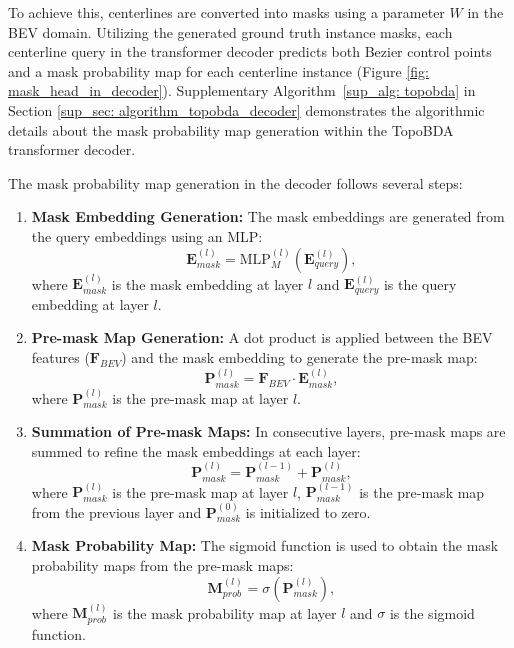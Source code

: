 To achieve this, centerlines are converted into masks using a parameter $W$ in the BEV domain. Utilizing the generated ground truth instance masks, each centerline query in the transformer decoder predicts both Bezier control points and a mask probability map for each centerline instance (Figure \ref{fig: mask_head_in_decoder}). Supplementary Algorithm~\ref{sup_alg: topobda} in Section \ref{sup_sec: algorithm_topobda_decoder} demonstrates the algorithmic details about the mask probability map generation within the TopoBDA transformer decoder. 

The mask probability map generation in the decoder follows several steps:

\begin{enumerate}
    \item \textbf{Mask Embedding Generation:}
    The mask embeddings are generated from the query embeddings using an MLP:
    \begin{equation}
        \mathbf{E}_{mask}^{(l)} = \text{MLP}_{M}^{(l)}(\mathbf{E}_{query}^{(l)}),
    \end{equation}
    where $\mathbf{E}_{mask}^{(l)}$ is the mask embedding at layer $l$ and $\mathbf{E}_{query}^{(l)}$ is the query embedding at layer $l$.

    \item \textbf{Pre-mask Map Generation:}
    A dot product is applied between the BEV features ($\mathbf{F}_{BEV}$) and the mask embedding to generate the pre-mask map:
    \begin{equation}
        \mathbf{P}_{mask}^{(l)} = \mathbf{F}_{BEV} \cdot \mathbf{E}_{mask}^{(l)},
    \end{equation}
    where $\mathbf{P}_{mask}^{(l)}$ is the pre-mask map at layer $l$.

    \item \textbf{Summation of Pre-mask Maps:}
    In consecutive layers, pre-mask maps are summed to refine the mask embeddings at each layer:
    \begin{equation}
        \mathbf{P}_{mask}^{(l)} = \mathbf{P}_{mask}^{(l-1)} + \mathbf{P}_{mask}^{(l)},
    \end{equation}
    where $\mathbf{P}_{mask}^{(l)}$ is the pre-mask map at layer $l$, $\mathbf{P}_{mask}^{(l-1)}$ is the pre-mask map from the previous layer and $\mathbf{P}_{mask}^{(0)}$ is initialized to zero. 

    \item \textbf{Mask Probability Map:}
    The sigmoid function is used to obtain the mask probability maps from the pre-mask maps:
    \begin{equation}
        \mathbf{M}_{prob}^{(l)} = \sigma(\mathbf{P}_{mask}^{(l)}),
    \end{equation}
    where $\mathbf{M}_{prob}^{(l)}$ is the mask probability map at layer $l$ and $\sigma$ is the sigmoid function.
\end{enumerate}



